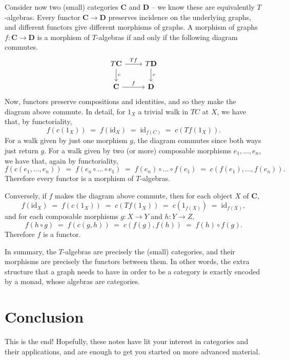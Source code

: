 \documentclass[12pt,oneside,headings=small]{scrbook}
\makeatletter
\newcommand*{\currentname}{\@currentlabelname}
\numberwithin{equation}{section}
\theoremstyle{plain}
\theoremstyle{definition}
\newcommand{\cat}[1]{{\mathbf{#1}}} %
\newcommand{\ar}[2][]{\arrow{#2}{#1}}
\DeclareMathOperator{\1}{\mathbbm{1}}
\DeclareMathOperator{\2}{\mathbbm{2}}
\newcommand{\id}{\mathrm{id}} %
\makeatother
\begin{document}
 Consider now two (small) categories $\cat{C}$ and $\cat{D}$ -- we know these are equivalently $T$-algebras. Every functor $\cat{C}\to\cat{D}$ preserves incidence on the underlying graphs, and different functors give different morphisms of graphs. A morphism of graphs $f:\cat{C}\to\cat{D}$ is a morphism of $T$-algebras if and only if the following diagram commutes.
 $$
 \begin{tikzcd}
  T\cat{C} \ar{d}{c} \ar{r}{Tf} & T\cat{D} \ar{d}{c} \\
  \cat{C} \ar{r}{f} & \cat{D}
 \end{tikzcd}
 $$
 Now, functors preserve compositions and identities, and so they make the diagram above commute. In detail, for $1_X$ a trivial walk in $TC$ at $X$, we have that, by functoriality,
 $$
 f(c(1_X)) \;=\; f(\id_X) \;=\; \id_{f(C)} \;=\; c(Tf(1_X)).
 $$
 For a walk given by just one morphism $g$, the diagram commutes since both ways just return $g$.
 For a walk given by two (or more) composable morphisms $e_1,\dots,e_n$, we have that, again by functoriality,
 $$
 f(c(e_1,\dots,e_n)) \;=\; f(e_n\circ\dots\circ e_1) \;=\;f(e_n)\circ\dots\circ f(e_1) \;=\; c(f(e_1),\dots,f(e_n)) .
 $$
 Therefore every functor is a morphism of $T$-algebras.
 
 Conversely, if $f$ makes the diagram above commute, then for each object $X$ of $\cat{C}$,
 $$
 f(\id_X) \;=\; f(c(1_X)) \;=\; c(Tf(1_X)) \;=\; c(1_{f(X)}) \;=\; \id_{f(X)} ,
 $$
 and for each composable morphisms $g:X\to Y$ and $h:Y\to Z$, 
 $$
 f(h\circ g) \;=\; f(c(g,h)) \;=\; c(f(g),f(h)) \;=\; f(h) \circ f(g) .
 $$
 Therefore $f$ is a functor. 
 
 In summary, the $T$-algebras are precisely the (small) categories, and their morphisms are precisely the functors between them. In other words, the extra structure that a graph needs to have in order to be a category is exactly encoded by a monad, whose algebras are categories.




\newpage
\chapter*{Conclusion}
\addcontentsline{toc}{chapter}{\currentname}


This is the end!  Hopefully, these notes have lit your interest in categories and their applications, and are enough to get you started on more advanced material. 
\end{document}
